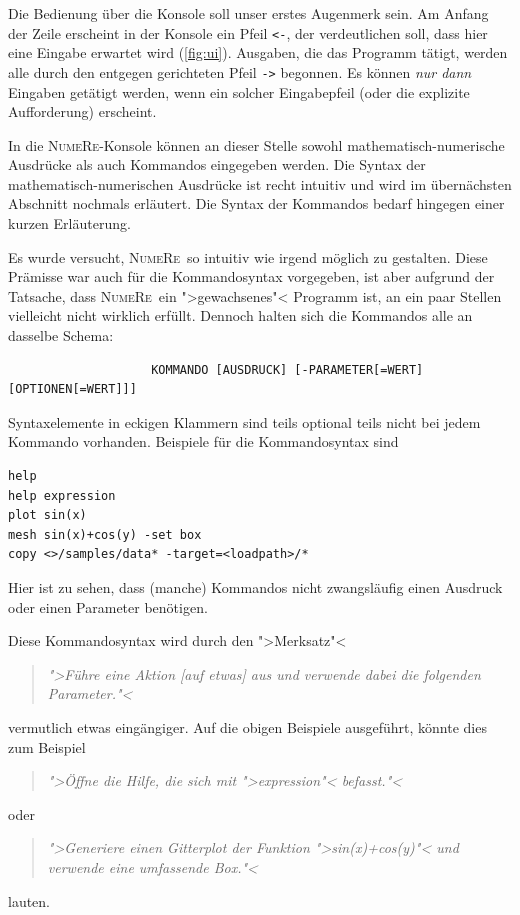 \documentclass[DIV=14,headsepline,footsepline]{scrbook}
\newcommand{\NR}{\textsc{Nu\-me\-Re}}
\begin{document}
				Die Bedienung über die Konsole soll unser erstes Augenmerk sein. Am Anfang der Zeile erscheint in der Konsole ein Pfeil \lstinline+<-+, der verdeutlichen soll, dass hier eine Eingabe erwartet wird (\autoref{fig:ui}). Ausgaben, die das Programm tätigt, werden alle durch den entgegen gerichteten Pfeil \lstinline+->+ begonnen. Es können \emph{nur dann} Eingaben getätigt werden, wenn ein solcher Eingabepfeil (oder die explizite Aufforderung) erscheint.
				
				In die \NR-Konsole können an dieser Stelle sowohl mathematisch-numerische Ausdrücke als auch Kommandos eingegeben werden. Die Syntax der mathematisch-numerischen Ausdrücke ist recht intuitiv und wird im übernächsten Abschnitt nochmals erläutert. Die Syntax der Kommandos bedarf hingegen einer kurzen Erläuterung.
				
				Es wurde versucht, \NR\ so intuitiv wie irgend möglich zu gestalten. Diese Prämisse war auch für die Kommandosyntax vorgegeben, ist aber aufgrund der Tatsache, dass \NR\ ein ">gewachsenes"< Programm ist, an ein paar Stellen vielleicht nicht wirklich erfüllt. Dennoch halten sich die Kommandos alle an dasselbe Schema:
				\begin{verbatim}
					KOMMANDO [AUSDRUCK] [-PARAMETER[=WERT] [OPTIONEN[=WERT]]]
				\end{verbatim}
				Syntaxelemente in eckigen Klammern sind teils optional teils nicht bei jedem Kommando vorhanden. Beispiele für die Kommandosyntax sind
				\begin{lstlisting}
help
help expression
plot sin(x)
mesh sin(x)+cos(y) -set box
copy <>/samples/data* -target=<loadpath>/*
				\end{lstlisting}
				Hier ist zu sehen, dass (manche) Kommandos nicht zwangsläufig einen Ausdruck oder einen Parameter benötigen.
				
				Diese Kommandosyntax wird durch den ">Merksatz"< 
				\begin{quotation}
					\noindent\emph{">Führe eine Aktion [auf etwas] aus und verwende dabei die folgenden Parameter."<}
				\end{quotation}
				vermutlich etwas eingängiger. Auf die obigen Beispiele ausgeführt, könnte dies zum Beispiel
				\begin{quotation}
					\noindent\emph{">Öffne die Hilfe, die sich mit ">expression"< befasst."<}
				\end{quotation}
				oder
				\begin{quotation}
					\noindent\emph{">Generiere einen Gitterplot der Funktion ">sin(x)+cos(y)"< und verwende eine umfassende Box."<}
				\end{quotation}
				lauten.
				
\end{document}
